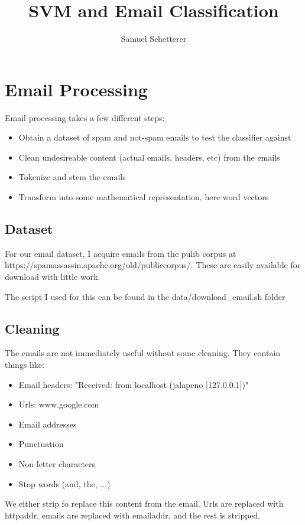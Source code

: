 \documentclass[]{article}
\title{SVM and Email Classification}
\author{Samuel Schetterer}
\begin{document}
\maketitle
\clearpage

\section{Email Processing}
Email processing takes a few different steps:

\begin{itemize}
	\item Obtain a dataset of spam and not-spam emails to test the classifier against
	\item Clean undesireable content (actual emails, headers, etc) from the emails
	\item Tokenize and stem the emails
	\item Transform into some mathematical representation, here word vectors
\end{itemize}

\subsection{Dataset}

For our email dataset, I acquire emails from the pulib corpus at https://spamassassin.apache.org/old/publiccorpus/. These are easily available for download with little work.

The script I used for this can be found in the data/download\_email.sh folder

\subsection{Cleaning}
The emails are not immediately useful without some cleaning. They contain things like:


\begin{itemize}
	\item Email headers: "Received: from localhost (jalapeno [127.0.0.1])"
	\item Urls: www.google.com
	\item Email addresses
	\item Punctuation
	\item Non-letter characters
	\item Stop words (and, the, ...)
\end{itemize}

We either strip fo replace this content from the email. Urls are replaced with httpaddr, emails are replaced with emailaddr, and the rest is stripped.
\end{document}
